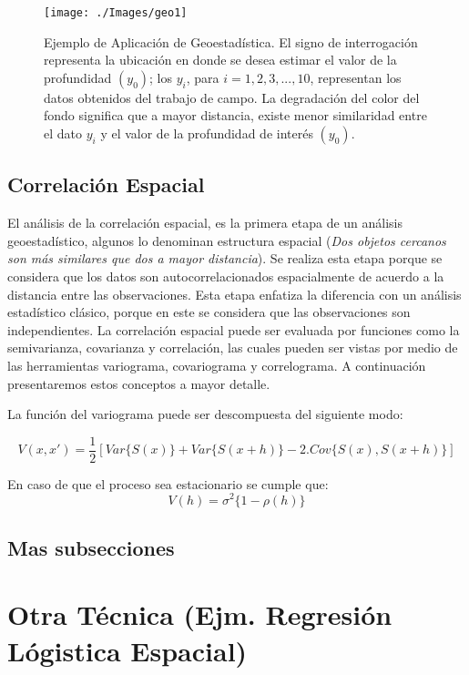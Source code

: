 \begin{figure}[!htb]
\centering
\texttt{[image: ./Images/geo1]}
\caption{Ejemplo de Aplicación de Geoestadística. El signo de interrogación representa la ubicación en donde se desea estimar el valor de la profundidad $(y_0)$; los $y_i$, para $i=1,2,3,...,10$, representan los datos obtenidos del trabajo de campo. La degradación del color del fondo significa que a mayor distancia, existe menor similaridad entre el dato $y_i$ y el valor de la profundidad de interés  $(y_0)$.}
\label{fig:2geo1}
\end{figure}

\subsection{Correlación Espacial}

El análisis de la correlación espacial, es la primera etapa de un análisis geoestadístico, algunos lo denominan estructura espacial (\textit{Dos objetos cercanos son más similares que dos a mayor distancia}). Se realiza esta etapa porque se considera que los datos son autocorrelacionados espacialmente de acuerdo a la distancia entre las observaciones. Esta etapa enfatiza la diferencia con un análisis estadístico clásico, porque en este se considera que las observaciones son independientes. La correlación espacial puede ser evaluada por funciones como la semivarianza, covarianza y correlación, las cuales pueden ser vistas por medio de las herramientas variograma, covariograma y correlograma. A continuación presentaremos estos conceptos a mayor detalle.

La función del variograma puede ser descompuesta del siguiente modo:

\[V(x,x')=\frac{1}{2}[Var\{S(x)\}+Var\{S(x+h)\}-2.Cov\{S(x),S(x+h)\}]\]

En caso de que el proceso sea estacionario se cumple que:
\begin{equation}
V(h)=\sigma^2\{1-\rho(h)\}
\label{eq:variogramaest}
\end{equation}

\subsection{Mas subsecciones}

\section{Otra Técnica (Ejm. Regresión Lógistica Espacial)}

